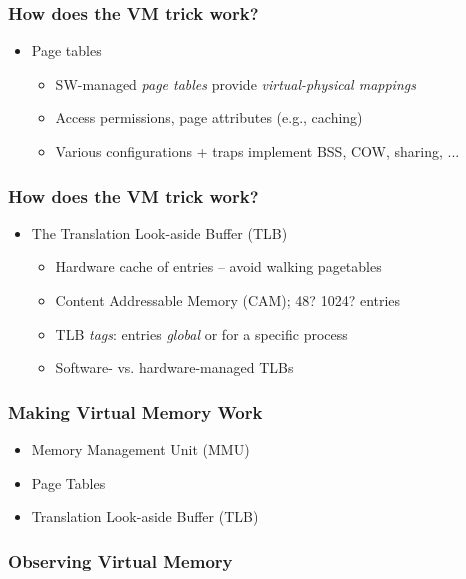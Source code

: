 \documentclass[pdftex]{beamer} %
\begin{document}
\begin{frame}
  \frametitle{How does the VM trick work?}

  \begin{itemize}

    \item Page tables
    \begin{itemize}
      \item SW-managed \textit{page tables} provide \textit{virtual-physical
	mappings}
      \item Access permissions, page attributes (e.g., caching)
      \item Various configurations + traps implement BSS, COW, sharing, ...
    \end{itemize}

  \end{itemize}
\end{frame}

\begin{frame}
  \frametitle{How does the VM trick work?}

  \begin{itemize}
    \item The Translation Look-aside Buffer (TLB)
    \begin{itemize}
      \item Hardware cache of entries -- avoid walking pagetables
      \item Content Addressable Memory (CAM); 48? 1024? entries
      \item TLB \textit{tags}: entries \textit{global} or for a specific process
      \item Software- vs. hardware-managed TLBs
    \end{itemize}

  \end{itemize}
\end{frame}

\begin{frame}
  \frametitle{Making Virtual Memory Work}
  \begin{itemize}
  \item Memory Management Unit (MMU)
  \item Page Tables
  \item Translation Look-aside Buffer (TLB)
  \end{itemize}
\end{frame}

\begin{frame}
  \frametitle{Observing Virtual Memory}
  
\end{frame}
\end{document}
